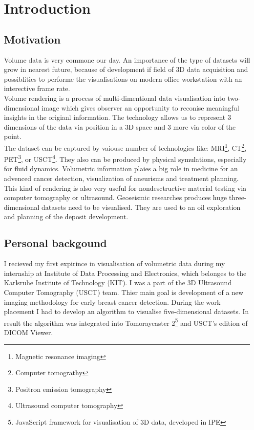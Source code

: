 \documentclass[english]{report}
\begin{document}
\newpage

\tableofcontents

\chapter{Introduction}

\section{Motivation}

Volume data is very commone our day. An importance of the type of datasets will grow in nearest future, because of development if field of 3D data acquisition and possiblities to performe the visualisations on modern office workstation with an interective frame rate.\\

Volume rendering is a process of multi-dimentional data visualisation into two-dimensional image which gives observer an opportunity to reconise meaningful insights in the origianl information. The technology allows us to represent 3 dimensions of the data via position in a 3D space and 3 more via color of the point.\\

The dataset can be captured by vaiouse number of technologies like: MRI\footnote{Magnetic resonance imaging}, CT\footnote{Computer tomograthy}, PET\footnote{Positron emission tomography}, or USCT\footnote{Ultrasound computer tomography}. They also can be produced by physical symulations, especially for fluid dynamics. Volumetric information plaies a big role in medicine for an advenced cancer detection, visualization of aneurisms and treatment planning. This kind of rendering is also very useful for nondesctructive material testing via computer tomography or ultrasound. Geoseismic researches produces huge three-dimensional datasets need to be visualised. They are used to an oil exploration and planning of the deposit development.\\


\section{Personal backgound}

I recieved my first expirince in visualisation of volumetric data during my internship at Institute of Data Processing and Electronics, which belonges to the Karlsruhe Institute of Technology (KIT). I was a part of the 3D Ultrasound Computer Tomography (USCT) team. Thier main goal is development of a new imaging methodology for early breast cancer detection. During the work placement I had to develop an algorithm to visualise five-dimensional datasets. In result the algorithm was integrated into Tomoraycaster 2\footnote{JavaScript framework for visualisation of 3D data, developed in IPE} and USCT's edition of DICOM Viewer.\\
\end{document}
